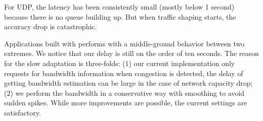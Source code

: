 For UDP, the latency has been consistently small (mostly below 1 second) because
there is no queue building up. But when traffic shaping starts, the accuracy
drop is catastrophic.

Applications built with \sysname{} performs with a middle-ground behavior
between two extremes. We notice that our delay is still on the order of ten
seconds. The reason for the slow adaptation is three-folds: (1) our current
implementation only requests for bandwidth information when congestion is
detected, the delay of getting bandwidth estimation can be large in the case of
network capacity drop; (2) we perform the bandwidth in a conservative way with
smoothing to avoid sudden spikes. While more improvements are possible, the
current settings are satisfactory.


